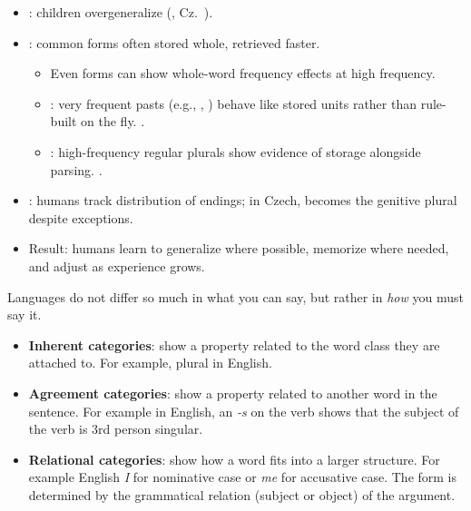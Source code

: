 \documentclass[a4paper,landscape,headrule,footrule]{foils}
\begin{document}
\begin{itemize}
  \item {}: children overgeneralize (, Cz.\ ).
  \item {}: common forms often stored whole, retrieved faster.
\begin{itemize}
  \item Even  forms can show whole-word frequency effects at high frequency.
  \item {} : very frequent pasts (e.g., , ) behave like stored units rather than rule-built on the fly. \citep{Alegre:Gordon:1999}.
  \item {} : high-frequency regular plurals show evidence of storage alongside parsing. \citep{Baayen:Dijkstra:Schreuder:1997}.
\end{itemize}
    
  \item {}: humans track distribution of endings; 
    in Czech,  becomes the  genitive plural despite exceptions.
  \item Result: humans learn to generalize where possible, memorize where needed,
    and adjust as experience grows.
\end{itemize}

Languages do not differ so much in what you can say, but rather in \textit{how} you must say it.
	
  \begin{itemize}
  \item
    \textbf{Inherent categories}: show a property related to the word class they are attached to.  For example, plural in English.
  \item
    \textbf{Agreement categories}: show a property related to another word in the sentence.  For example in English, an \emph{-s} on the verb shows that the subject of the verb is 3rd person singular.
   \item
  \textbf{Relational categories}: show how a word fits into a larger structure.  For example English  \emph{I} for nominative case or \emph{me} for accusative case. The  form is determined by the grammatical relation (subject or object) of the argument.
  \end{itemize}
\end{document}
